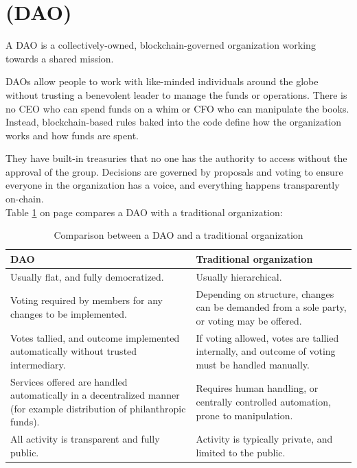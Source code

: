\documentclass[MSE,Master,english]{twbook}%
\begin{document}
\section{ (DAO)}
A DAO is a collectively-owned, blockchain-governed organization working towards a shared mission.

DAOs allow people to work with like-minded individuals around the globe without trusting a benevolent leader to manage the funds or operations. There is no CEO who can spend funds on a whim or CFO who can manipulate the books. Instead, blockchain-based rules baked into the code define how the organization works and how funds are spent.

They have built-in treasuries that no one has the authority to access without the approval of the group. Decisions are governed by proposals and voting to ensure everyone in the organization has a voice, and everything happens transparently on-chain.\cite{DAO} \\

Table \ref{table:DAOComparison} on page \pageref{table:DAOComparison} compares a DAO with a traditional organization:
\begin{center}
  \begin{table}[H]
    \begin{tabular}{ | m{20em} | m{20em} | }
      \hline
      \textbf{DAO} & \textbf{Traditional organization} \\ 
      \hline
      Usually flat, and fully democratized. & Usually hierarchical. \\
      \hline  
      Voting required by members for any changes to be implemented. & Depending on structure, changes can be demanded from a sole party, or voting may be offered. \\
      \hline
      Votes tallied, and outcome implemented automatically without trusted intermediary. & If voting allowed, votes are tallied internally, and outcome of voting must be handled manually. \\
      \hline
      Services offered are handled automatically in a decentralized manner (for example distribution of philanthropic funds). & Requires human handling, or centrally controlled automation, prone to manipulation. \\
      \hline
      All activity is transparent and fully public. & Activity is typically private, and limited to the public. \\
      \hline
    \end{tabular}
    \caption{Comparison between a DAO and a traditional organization \cite{DAO}}
    \label{table:DAOComparison}
  \end{table}
\end{center}
\end{document}

